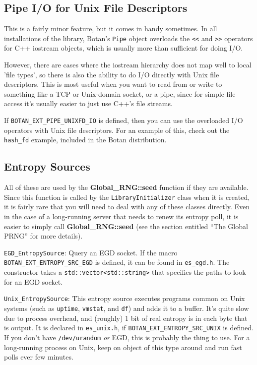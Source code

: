 \documentclass{article}
\newcommand{\filename}[1]{\texttt{#1}}
\newcommand{\macro}[1]{\texttt{#1}}
\newcommand{\function}[1]{\textbf{#1}}
\newcommand{\keyword}[1]{\texttt{#1}}
\newcommand{\type}[1]{\texttt{#1}}
\begin{document}
\subsection{Pipe I/O for Unix File Descriptors}

This is a fairly minor feature, but it comes in handy sometimes. In all
installations of the library, Botan's \type{Pipe} object overloads the
\keyword{<<} and \keyword{>>} operators for C++ iostream objects, which is
usually more than sufficient for doing I/O.

However, there are cases where the iostream hierarchy does not map well to
local 'file types', so there is also the ability to do I/O directly with Unix
file descriptors. This is most useful when you want to read from or write to
something like a TCP or Unix-domain socket, or a pipe, since for simple file
access it's usually easier to just use C++'s file streams.

If \macro{BOTAN\_EXT\_PIPE\_UNIXFD\_IO} is defined, then you can use the
overloaded I/O operators with Unix file descriptors. For an example of this,
check out the \filename{hash\_fd} example, included in the Botan distribution.

\subsection{Entropy Sources}

All of these are used by the \function{Global\_RNG::seed} function if they are
available. Since this function is called by the \type{LibraryInitializer} class
when it is created, it is fairly rare that you will need to deal with any of
these classes directly. Even in the case of a long-running server that needs to
renew its entropy poll, it is easier to simply call
\function{Global\_RNG::seed} (see the section entitled ``The Global PRNG'' for
more details).

\noindent
\type{EGD\_EntropySource}: Query an EGD socket. If the macro
\macro{BOTAN\_EXT\_ENTROPY\_SRC\_EGD} is defined, it can be found in
\filename{es\_egd.h}. The constructor takes a \type{std::vector<std::string>}
that specifies the paths to look for an EGD socket.

\noindent
\type{Unix\_EntropySource}: This entropy source executes programs common on
Unix systems (such as \filename{uptime}, \filename{vmstat}, and \filename{df})
and adds it to a buffer. It's quite slow due to process overhead, and (roughly)
1 bit of real entropy is in each byte that is output. It is declared in
\filename{es\_unix.h}, if \macro{BOTAN\_EXT\_ENTROPY\_SRC\_UNIX} is
defined. If you don't have \filename{/dev/urandom} \emph{or} EGD, this is
probably the thing to use. For a long-running process on Unix, keep on object
of this type around and run fast polls ever few minutes.
\end{document}
